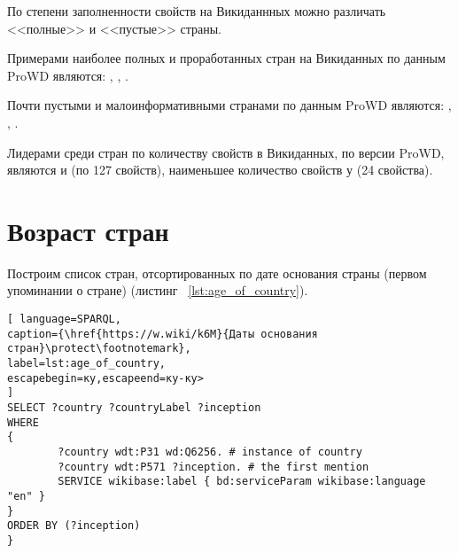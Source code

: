 По степени заполненности свойств на Викиданнных можно различать <<полные>> и  <<пустые>> страны. 

Примерами наиболее полных и проработанных стран на Викиданных по данным ProWD\cite{country_0} являются: , , .

Почти пустыми и малоинформативными странами по данным ProWD являются: , , .

Лидерами среди стран по количеству свойств в Викиданных, по версии ProWD, являются  и  (по 127 свойств), наименьшее количество свойств у  (24 свойства).

\section{Возраст стран}


Построим список стран, отсортированных по дате основания страны (первом упоминании о стране) (листинг ~\ref{lst:age_of_country}).

\begin{lstlisting}[ language=SPARQL, 
caption={\href{https://w.wiki/k6M}{Даты основания стран}\protect\footnotemark},
label=lst:age_of_country, 
escapebegin=ку,escapeend=ку-ку>
]
SELECT ?country ?countryLabel ?inception
WHERE
{
		?country wdt:P31 wd:Q6256. # instance of country
		?country wdt:P571 ?inception. # the first mention	
		SERVICE wikibase:label { bd:serviceParam wikibase:language "en" }
}
ORDER BY (?inception)
}
\end{lstlisting}

